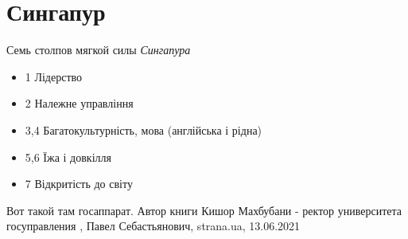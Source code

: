  
 
 
 
 
\chapter{Сингапур}
\label{sec:slova.singapur}

Семь столпов мягкой силы \emph{Сингапура}
\begin{itemize}
  \item 1 Лідерство
  \item 2 Належне управління
  \item 3,4 Багатокультурність, мова (англійська і рідна)
  \item 5,6 Їжа і довкілля
  \item 7 Відкритість до світу
\end{itemize}
Вот такой там госаппарат. Автор книги Кишор Махбубани - ректор университета
госуправления
, 
Павел Себастьянович, strana.ua, 13.06.2021

